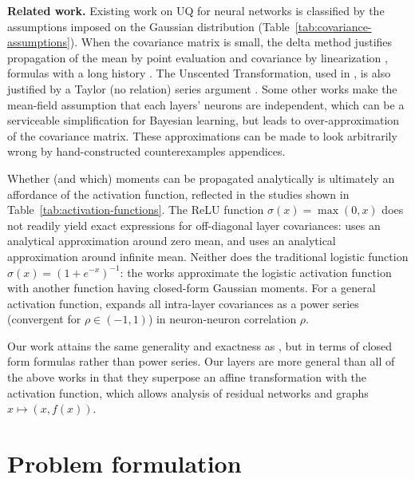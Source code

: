 \documentclass{article}
\begin{document}
\textbf{Related work.}
Existing work on UQ for neural networks is classified by the assumptions imposed on the Gaussian distribution (Table~\ref{tab:covariance-assumptions}).
When the covariance matrix is small, the delta method justifies propagation of the mean by point evaluation and covariance by linearization \cite{titensky_uncertainty_2018,nagel_kalman-bucy-informed_2022,petersen_uncertainty_2024,jungmann_analytical_2025}, formulas with a long history \citep[Chapter 187]{gauss_theory_1857} \citep{taylor_introduction_1997}.
The Unscented Transformation, used in \citet{astudillo_propagation_2011,abdelaziz_uncertainty_2015}, is also justified by a Taylor (no relation) series argument \citep{julier_scaled_2002}.
Some other works \citep{huber_bayesian_2020,wagner_kalman_2022,akgul_deterministic_2025} make the mean-field assumption that each layers' neurons are independent, which can be a serviceable simplification for Bayesian learning, but leads to over-approximation of the covariance matrix.
These approximations can be made to look arbitrarily wrong by hand-constructed counterexamples {\color{red} appendices}.


Whether (and which) moments can be propagated analytically is ultimately an affordance of the activation function, reflected in the studies shown in Table~\ref{tab:activation-functions}.
The ReLU function \(\sigma(x) = \max(0, x)\) does not readily yield exact expressions for off-diagonal layer covariances:
\citet{bibi_analytic_2018} uses an analytical approximation around zero mean, and \citet{wu_deterministic_2019} uses an analytical approximation around infinite mean.
Neither does the traditional logistic function \(\sigma(x) = (1 + e^{-x})^{-1}\):
the works  \citet{astudillo_propagation_2011,abdelaziz_uncertainty_2015,huber_bayesian_2020} approximate the logistic activation function with another function having closed-form Gaussian moments.
For a general activation function, 
\citet{wright_analytic_2024} expands all intra-layer covariances as a power series (convergent for \(\rho \in (-1, 1)\)) in neuron-neuron correlation \(\rho\).

Our work attains the same generality and exactness as \citet{wright_analytic_2024}, but in terms of closed form formulas rather than power series.
Our layers are more general than all of the above works in that they superpose an affine transformation with the activation function, which allows analysis of residual networks and graphs \(x \mapsto (x, f(x))\).

\section{Problem formulation}
\end{document}
